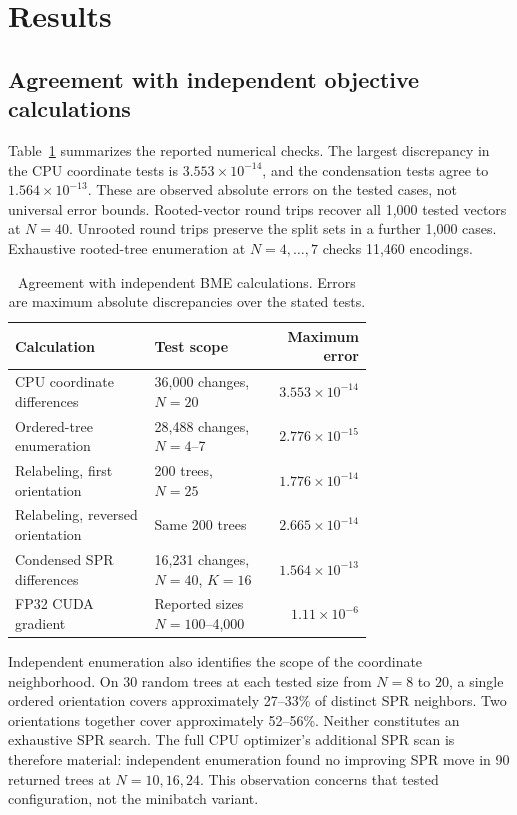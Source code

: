 \documentclass[11pt,a4paper]{article}
\makeatletter
\DeclareRobustCommand{\_}{\ifmmode\nfss@text{\textunderscore}\else\textunderscore\allowbreak\fi}
\theoremstyle{definition}
\makeatother
\begin{document}
\section{Results}
\label{sec:results}

\subsection{Agreement with independent objective calculations}

Table~\ref{tab:validation} summarizes the reported numerical checks.
The largest discrepancy in the CPU coordinate tests is $3.553\times10^{-14}$, and the condensation tests agree to $1.564\times10^{-13}$.
These are observed absolute errors on the tested cases, not universal error bounds.
Rooted-vector round trips recover all 1,000 tested vectors at $N=40$.
Unrooted round trips preserve the split sets in a further 1,000 cases.
Exhaustive rooted-tree enumeration at $N=4,\ldots,7$ checks 11,460 encodings.

\begin{table}[tb]
\centering
\caption{Agreement with independent BME calculations. Errors are maximum absolute discrepancies over the stated tests.}
\label{tab:validation}
\small
\begin{tabular}{@{}p{0.39\linewidth}p{0.32\linewidth}r@{}}
\toprule
Calculation & Test scope & Maximum error\\
\midrule
CPU coordinate differences & 36,000 changes, $N=20$ & $3.553\times10^{-14}$\\
Ordered-tree enumeration & 28,488 changes, $N=4$--7 & $2.776\times10^{-15}$\\
Relabeling, first orientation & 200 trees, $N=25$ & $1.776\times10^{-14}$\\
Relabeling, reversed orientation & Same 200 trees & $2.665\times10^{-14}$\\
Condensed SPR differences & 16,231 changes, $N=40$, $K=16$ & $1.564\times10^{-13}$\\
FP32 CUDA gradient & Reported sizes $N=100$--4,000 & $1.11\times10^{-6}$\\
\bottomrule
\end{tabular}
\end{table}

Independent enumeration also identifies the scope of the coordinate neighborhood.
On 30 random trees at each tested size from $N=8$ to $20$, a single ordered orientation covers approximately 27--33\% of distinct SPR neighbors.
Two orientations together cover approximately 52--56\%.
Neither constitutes an exhaustive SPR search.
The full CPU optimizer's additional SPR scan is therefore material: independent enumeration found no improving SPR move in 90 returned trees at $N=10,16,24$.
This observation concerns that tested configuration, not the minibatch variant.
\end{document}
